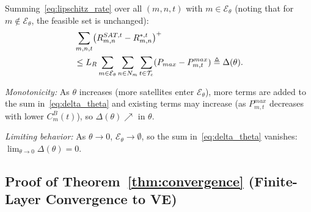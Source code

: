 \documentclass[journal]{IEEEtran}
\newcommand{\CB}{C^{B}}
\newcommand{\Pmax}{P_{max}}
\newcommand{\calT}{\mathcal{T}}
\begin{document}
\begin{IEEEproof}
Summing~\eqref{eq:lipschitz_rate} over all $(m,n,t)$ with $m \in \mathcal{E}_\theta$ (noting that for $m \notin \mathcal{E}_\theta$, the feasible set is unchanged):
\begin{align}
    &\sum_{m,n,t}
    \bigl(R_{m,n}^{SAT,t} - R_{m,n}^{*,t}\bigr)^+
    \notag\\
    &\leq L_R
    \sum_{m \in \mathcal{E}_\theta}
    \sum_{n \in N_m} \sum_{t \in \calT_e}
    (\Pmax - P_{m,t}^{max})
    \triangleq \Delta(\theta).
    \label{eq:delta_theta}
\end{align}

\noindent\emph{Monotonicity:}
As $\theta$ increases (more satellites enter $\mathcal{E}_\theta$), more terms are added to the sum in~\eqref{eq:delta_theta} and existing terms may increase (as $P_{m,t}^{max}$ decreases with lower $\CB_m(t)$), so $\Delta(\theta) \nearrow$ in $\theta$.

\noindent\emph{Limiting behavior:}
As $\theta \to 0$, $\mathcal{E}_\theta \to
\emptyset$, so the sum in~\eqref{eq:delta_theta}
vanishes: $\lim_{\theta \to 0} \Delta(\theta) = 0$.

\end{IEEEproof}

\subsection{Proof of Theorem~\ref{thm:convergence}
(Finite-Layer Convergence to VE)}
\end{document}

